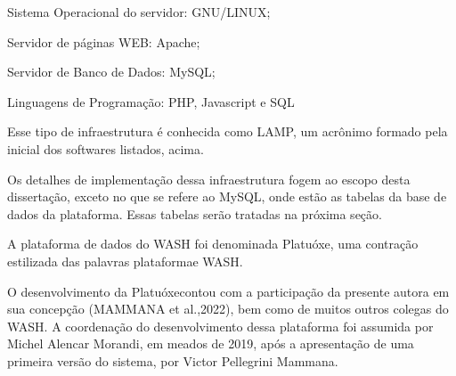 \documentclass[
12pt,		%
openright,	%
twoside,  %
a4paper,			%
chapter=TITLE,		%
english,			%
french,				%
spanish,			%
brazil				%
]{USPSC-classe/USPSC}
\begin{document}
\begin{alineas}
\item Sistema Operacional do servidor: GNU/LINUX;
\item Servidor de p\'aginas WEB: Apache;
\item Servidor de Banco de Dados: MySQL;
\item Linguagens de Programa\c{c}\~ao: PHP, Javascript e SQL
\end{alineas}

Esse tipo de infraestrutura \'e conhecida como LAMP, um acr\^onimo formado pela inicial dos softwares listados, acima.

















Os detalhes de implementa\c{c}\~ao dessa infraestrutura fogem ao escopo desta disserta\c{c}\~ao, exceto no que se refere ao MySQL, onde est\~ao as tabelas da base de dados da plataforma. Essas tabelas ser\~ao tratadas na pr\'oxima se\c{c}\~ao.

















A plataforma de dados do WASH foi denominada \textquotedbl Platu\'oxe\textquotedbl , uma contra\c{c}\~ao estilizada das palavras \textquotedbl plataforma\textquotedbl  e \textquotedbl WASH\textquotedbl .

















O desenvolvimento da \textquotedbl Platu\'oxe\textquotedbl  contou com a participa\c{c}\~ao da presente autora em sua concep\c{c}\~ao  (MAMMANA et al.,2022), bem como de muitos outros colegas do WASH. A coordena\c{c}\~ao do desenvolvimento dessa plataforma foi assumida por Michel Alencar Morandi, em meados de 2019, ap\'os a apresenta\c{c}\~ao de uma primeira vers\~ao do sistema, por Victor Pellegrini Mammana.
\end{document}
